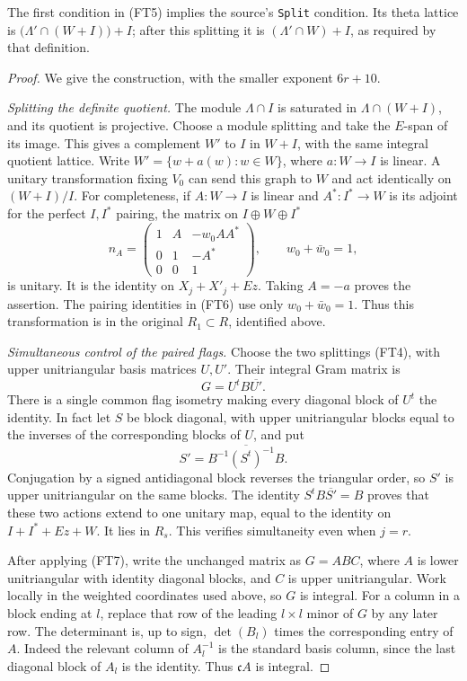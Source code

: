 The first condition in (FT5) implies the source's
\texttt{Split} condition.  Its theta lattice is
$\bigl(\Lambda'\cap(W+I)\bigr)+I$; after this splitting
it is $(\Lambda'\cap W)+I$, as required by that definition.

\begin{proof}
We give the construction, with the smaller exponent $6r+10$.

\smallskip\noindent\emph{Splitting the definite quotient.}
The module $\Lambda\cap I$ is saturated in
$\Lambda\cap(W+I)$, and its quotient is projective.
Choose a module splitting and take the $E$-span of its
image.  This gives a complement $W'$ to $I$ in $W+I$,
with the same integral quotient lattice.  Write
$W'=\{w+a(w):w\in W\}$, where $a:W\to I$ is linear.
A unitary transformation fixing $V_0$ can send this graph
to $W$ and act identically on $(W+I)/I$.
For completeness, if $A:W\to I$ is linear and $A^*:I^*\to W$
is its adjoint for the perfect $I,I^*$ pairing, the matrix
on $I\oplus W\oplus I^*$
\[
 n_A=
 \begin{pmatrix}
  1&A&-w_0AA^*\\
  0&1&-A^*\\
  0&0&1
 \end{pmatrix},\qquad w_0+\bar w_0=1,
 \tag{FT6}
\]
is unitary.  It is the identity on $X_j+X'_j+Ez$.
Taking $A=-a$ proves the assertion.  The pairing identities
in (FT6) use only $w_0+\bar w_0=1$.  Thus this transformation
is in the original $R_1\subset R$, identified above.

\smallskip\noindent\emph{Simultaneous control of the paired flags.}
Choose the two splittings (FT4), with upper unitriangular
basis matrices $U,U'$.  Their integral Gram matrix is
\[
                         G=U^tB\overline{U'}.
\]
There is a single common flag isometry making every
diagonal block of $U^t$ the identity.  In fact let $S$ be
block diagonal, with upper unitriangular blocks equal to
the inverses of the corresponding blocks of $U$, and put
\[
                    S'=\overline{B^{-1}(S^t)^{-1}B}.
 \tag{FT7}
\]
Conjugation by a signed antidiagonal block reverses the
triangular order, so $S'$ is upper unitriangular on the
same blocks.  The identity $S^tB\overline{S'}=B$ proves
that these two actions extend to one unitary map, equal
to the identity on $I+I^*+Ez+W$.  It lies in $R_s$.
This verifies simultaneity even when $j=r$.

After applying (FT7), write the unchanged matrix as
$G=ABC$, where $A$ is lower unitriangular with identity
diagonal blocks, and $C$ is upper unitriangular.  Work
locally in the weighted coordinates used above, so $G$
is integral.  For a column in a block ending at $l$,
replace that row of the leading $l\times l$ minor of
$G$ by any later row.  The determinant is, up to sign,
$\det(B_l)$ times the corresponding entry of $A$.
Indeed the relevant column of $A_l^{-1}$ is the standard
basis column, since the last diagonal block of $A_l$ is
the identity.  Thus $\mathfrak cA$ is integral.


\end{proof}
